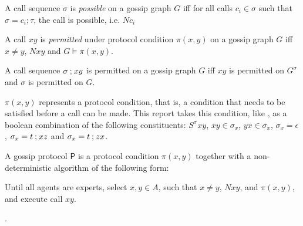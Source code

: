 \begin{definition}[Calls]
    \begin{subdefinition}
        \label{def:call-sequence-possibility}
        A call sequence \(\sigma\) is \emph{possible} on a gossip graph \(G\) iff for all calls \(c_i \in \sigma\) such that \(\sigma = c_i\mathbin{;}\tau\), the call is possible, i.e. \(Nc_i\)
    \end{subdefinition}

    \begin{subdefinition}
        \label{def:call-permissibility}
        A call \(xy\) is \emph{permitted} under protocol condition \(\pi(x,y)\) on a gossip graph \(G\) iff \(x \neq y\), \(N xy\) and \(G \models \pi(x,y)\).
    \end{subdefinition}

    \begin{subdefinition}
        \label{def:call-sequence-permissibility}
        A call sequence \(\sigma \mathbin{;} xy\) is permitted on a gossip graph \(G\) iff \(xy\) is permitted on \(G^\sigma\) and \(\sigma\) is permitted on \(G\).
    \end{subdefinition}
\end{definition}

\begin{definition}
    \label{def:gossip-protocols}
    \begin{subdefinition}
        \label{def:protocol-condition}
        \(\pi(x,y)\) represents a protocol condition, that is, a condition that needs to be satisfied before a call can be made.
        This report takes this condition, like \Textcite{van_ditmarsch_dynamic_2018}, as a boolean combination of the following constituents: \(S^\sigma xy\), \(xy \in \sigma_x\), \(yx \in \sigma_x\), \(\sigma_x = \epsilon\), \(\sigma_x = t \mathbin{;} xz\) and \(\sigma_x = t \mathbin{;} zx\).
    \end{subdefinition}
    
    \begin{subdefinition}
        \label{def:gossip-protocol}
        A gossip protocol \(\mathsf{P}\) is a protocol condition \(\pi(x,y)\) together with a non-deterministic algorithm of the following form:
        
        \begin{displayquote}
            Until all agents are experts, select \( x, y \in A \), such that \( x \neq y \), \(Nxy\), and \( \pi(x, y) \), and execute call \(xy\).
            
        \parencite[Def. 5]{van_ditmarsch_dynamic_2018}.
        \end{displayquote}
        
    \end{subdefinition}
\end{definition}


